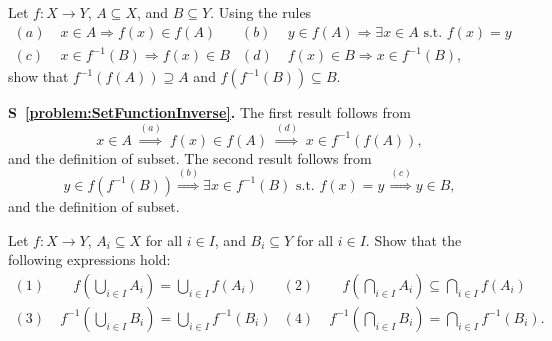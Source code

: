 \begin{problem}
\label{problem:SetFunctionInverse}
Let $f:X\rightarrow Y$, $A\subseteq X$, and $B\subseteq Y$.
Using the rules
\begin{align*}
(a) & \; x \in A \Rightarrow f(x) \in f(A) &
(b) & \; y \in f(A) \Rightarrow \exists x\in A \textrm{ s.t. } f(x)=y \\
(c) & \; x\in f^{-1}(B) \Rightarrow f(x) \in B &
(d) & \; f(x) \in B \Rightarrow x\in f^{-1}(B),
\end{align*}
show that $f^{-1}(f(A)) \supseteq A$ and $f(f^{-1}(B)) \subseteq B$.
\end{problem}
\noindent \textbf{S~\ref{problem:SetFunctionInverse}.}
The first result follows from
\[ x\in A \; \stackrel{(a)}{\Rightarrow} \; f(x)\in f(A) \; \stackrel{(d)}{\Rightarrow} \; x\in f^{-1}(f(A)), \]
and the definition of subset.
The second result follows from
\[ y\in f(f^{-1}(B)) \stackrel{(b)}{\Rightarrow} \exists x\in f^{-1}(B) \textrm{ s.t. } f(x)=y \, \stackrel{(c)}{\Rightarrow} y\in B, \]
and the definition of subset.

\begin{problem}
Let $f: X\rightarrow Y$, $A_i \subseteq X$ for all $i\in I$, and $B_i \subseteq Y$ for all $i\in I$.
Show that the following expressions hold:
\begin{align*}
(1) & \;\;\;\:\, f \left( \bigcup_{i\in I} A_i \right) = \bigcup_{i\in I} f \left( A_i \right) &
(2) & \;\;\;\:\, f \left( \bigcap_{i\in I} A_i \right) \subseteq \bigcap_{i\in I} f \left( A_i \right) \\
(3) & \; f^{-1} \left( \bigcup_{i\in I} B_i \right) = \bigcup_{i\in I} f^{-1} \left( B_i \right) &
(4) & \; f^{-1} \left( \bigcap_{i\in I} B_i \right) = \bigcap_{i\in I} f^{-1} \left( B_i \right). 
\end{align*}
\end{problem}

